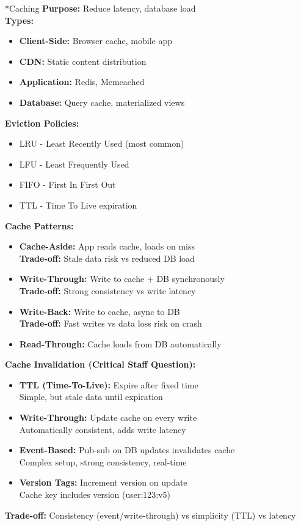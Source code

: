 \documentclass[8pt,landscape]{extarticle}
\makeatletter
\renewcommand{\subsection}{\@startsection{subsection}{2}{0pt}{3pt}{1pt}{\normalfont\normalsize\bfseries}}
\makeatother
\begin{document}
\begin{multicols*}{3}
\subsection*{Caching}
\textbf{Purpose:} Reduce latency, database load \\
\textbf{Types:}
\begin{itemize}
\item \textbf{Client-Side:} Browser cache, mobile app
\item \textbf{CDN:} Static content distribution
\item \textbf{Application:} Redis, Memcached
\item \textbf{Database:} Query cache, materialized views
\end{itemize}
\textbf{Eviction Policies:}
\begin{itemize}
\item LRU - Least Recently Used (most common)
\item LFU - Least Frequently Used
\item FIFO - First In First Out
\item TTL - Time To Live expiration
\end{itemize}
\textbf{Cache Patterns:}
\begin{itemize}
\item \textbf{Cache-Aside:} App reads cache, loads on miss
  \\ \textbf{Trade-off:} Stale data risk vs reduced DB load
\item \textbf{Write-Through:} Write to cache + DB synchronously
  \\ \textbf{Trade-off:} Strong consistency vs write latency
\item \textbf{Write-Back:} Write to cache, async to DB
  \\ \textbf{Trade-off:} Fast writes vs data loss risk on crash
\item \textbf{Read-Through:} Cache loads from DB automatically
\end{itemize}
\textbf{Cache Invalidation (Critical Staff Question):}
\begin{itemize}
\item \textbf{TTL (Time-To-Live):} Expire after fixed time
  \\ Simple, but stale data until expiration
\item \textbf{Write-Through:} Update cache on every write
  \\ Automatically consistent, adds write latency
\item \textbf{Event-Based:} Pub-sub on DB updates invalidates cache
  \\ Complex setup, strong consistency, real-time
\item \textbf{Version Tags:} Increment version on update
  \\ Cache key includes version (user:123:v5)
\end{itemize}
\textbf{Trade-off:} Consistency (event/write-through) vs simplicity (TTL) vs latency


\end{multicols*}
\end{document}
